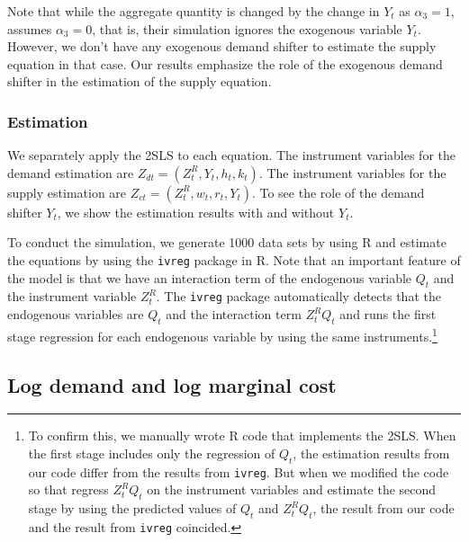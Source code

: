 \documentclass[11pt, a4paper]{article}
\begin{document}
Note that while the aggregate quantity is changed by the change in $Y_t$ as $\alpha_3 =1$, \cite{perloff2012collinearity} assumes $\alpha_3 = 0$, that is, their simulation ignores the exogenous variable $Y_t$.
However, we don't have any exogenous demand shifter to estimate the supply equation in that case.
Our results emphasize the role of the exogenous demand shifter in the estimation of the supply equation.



\subsubsection{Estimation}

We separately apply the 2SLS to each equation.
The instrument variables for the demand estimation are $Z_{dt} = (Z^R_t, Y_t, h_t, k_t)$.
The instrument variables for the supply estimation are $Z_{ct} = (Z^R_t, w_t, r_t, Y_t)$. 
To see the role of the demand shifter $Y_t$, we show the estimation results with and without $Y_t$.

To conduct the simulation, we generate 1000 data sets by using R and estimate the equations by using the \texttt{ivreg} package in R.
Note that an important feature of the model is that we have an interaction term of the endogenous variable $Q_t$ and the instrument variable $Z^R_t$.
The \texttt{ivreg} package automatically detects that the endogenous variables are $Q_t$ and the interaction term $Z^R_tQ_t$ and runs the first stage regression for each endogenous variable by using the same instruments.\footnote{To confirm this, we manually wrote R code that implements the 2SLS. When the first stage includes only the regression of $Q_t$, the estimation results from our code differ from the results from \texttt{ivreg}. But when we modified the code so that regress $Z^R_tQ_t$ on the instrument variables and estimate the second stage by using the predicted values of $Q_t$ and $Z^R_tQ_t$, the result from our code and the result from \texttt{ivreg} coincided.}


\subsection{Log demand and log marginal cost}
\end{document}
